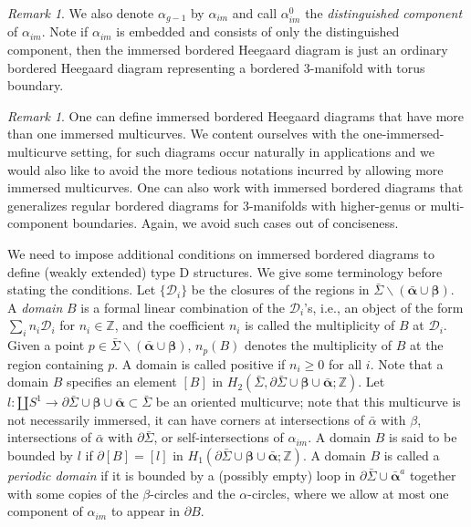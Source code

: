 \documentclass{amsart}
\theoremstyle{definition}
\theoremstyle{remark}
\newtheorem{rmk}[thm]{Remark}
\numberwithin{equation}{section}
\numberwithin{equation}{section} \makeatletter
\begin{document}
\begin{rmk}
	We also denote $\alpha_{g-1}$ by $\alpha_{im}$ and call $\alpha_{im}^0$ the \emph{distinguished component} of $\alpha_{im}$. Note if $\alpha_{im}$ is embedded and consists of only the distinguished component, then the immersed bordered Heegaard diagram is just an ordinary bordered Heegaard diagram representing a bordered 3-manifold with torus boundary. 
\end{rmk}
\begin{rmk}
One can define immersed bordered Heegaard diagrams that have more than one immersed multicurves. We content ourselves with the one-immersed-multicurve setting, for such diagrams occur naturally in applications and we would also like to avoid the more tedious notations incurred by allowing more immersed multicurves. One can also work with immersed bordered diagrams that generalizes regular bordered diagrams for 3-manifolds with higher-genus or multi-component boundaries. Again, we avoid such cases out of conciseness.  
\end{rmk}
We need to impose additional conditions on immersed bordered diagrams to define (weakly extended) type D structures. We give some terminology before stating the conditions. Let $\{\mathcal{D}_i\}$ be the closures of the regions in $\bar{\Sigma}\backslash(\bm{\bar{\alpha}}\cup\bm{\beta})$. A \emph{domain} $B$ is a formal linear combination of the $\mathcal{D}_i$'s, i.e., an object of the form $\sum_{i}n_i\mathcal{D}_i$ for $n_i\in\mathbb{Z}$, and the coefficient $n_i$ is called the multiplicity of $B$ at $\mathcal{D}_i$. Given a point $p\in\bar{\Sigma}\backslash(\bm{\bar{\alpha}}\cup\bm{\beta})$, $n_p(B)$ denotes the multiplicity of $B$ at the region containing $p$. A domain is called positive if $n_i\geq 0$ for all $i$. Note that a domain $B$ specifies an element $[B]$ in $H_2(\bar{\Sigma},\partial\bar{\Sigma}\cup\bm{\beta}\cup\bm{\bar{\alpha}};\mathbb{Z})$. Let $l:\amalg S^1\rightarrow \partial\bar{\Sigma}\cup\bm{\beta}\cup\bm{\bar{\alpha}}\subset\bar{\Sigma}$ be an oriented multicurve; note that this multicurve is not necessarily immersed, it can have corners at intersections of $\bar\alpha$ with $\beta$, intersections of $\bar\alpha$ with $\partial \bar\Sigma$, or self-intersections of $\alpha_{im}$. A domain $B$ is said to be bounded by $l$ if $\partial [B]=[l]$ in $H_1(\partial\bar{\Sigma}\cup\bm{\beta}\cup\bm{\bar{\alpha}};\mathbb{Z})$. A domain $B$ is called a \emph{periodic domain} if it is bounded by a (possibly empty) loop in $\partial\bar{\Sigma}\cup\bar{\bm{\alpha}}^a$ together with some copies of the $\beta$-circles and the $\alpha$-circles, where we allow at most one component of $\alpha_{im}$ to appear in $\partial B$. 
\end{document}
